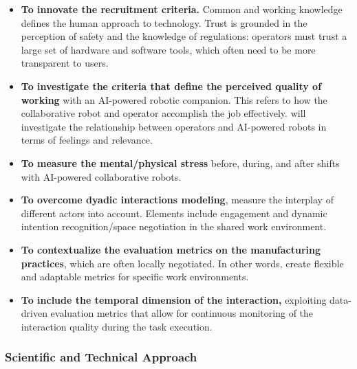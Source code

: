 \begin{itemize}[compact]
\item
  \textbf{To innovate the recruitment criteria.} Common and working
  knowledge defines the human approach to technology. Trust is grounded
  in the perception of safety and the knowledge of regulations:
  operators must trust a large set of hardware and software tools, which
  often need to be more transparent to users.
\item
  \textbf{To investigate the criteria that define the perceived quality
  of working} with an AI-powered robotic companion. This refers to how
  the collaborative robot and operator accomplish the job effectively.
   will investigate the relationship between operators
  and AI-powered robots in terms of feelings and relevance.
\item
  \textbf{To measure the mental/physical stress} before, during, and
  after shifts with AI-powered collaborative robots.
\item
  \textbf{To overcome dyadic interactions modeling}, measure the
  interplay of different actors into account. Elements include
  engagement and dynamic intention recognition/space negotiation in the
  shared work environment.
\item
  \textbf{To contextualize the evaluation metrics on the manufacturing
  practices}, which are often locally negotiated. In other words, create
  flexible and adaptable metrics for specific work environments.
\item
  \textbf{To include the temporal dimension of the interaction,}
  exploiting data-driven evaluation metrics that allow for continuous
  monitoring of the interaction quality during the task execution.
\end{itemize}

\subsubsection{Scientific and Technical
Approach}\label{scientific-and-technical-approach-3}

